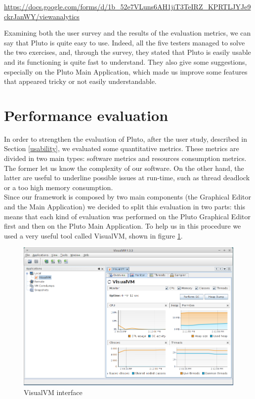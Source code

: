 \url{https://docs.google.com/forms/d/1b_52e7VLuns6AH1jiT3TeIRZ_KPRTLJYJe9ckrJanWY/viewanalytics}
\newpage

Examining both the user survey and the results of the evaluation metrics, we can say that Pluto is quite easy to use.
Indeed, all the five testers managed to solve the two exercises, and, through the survey, they stated that Pluto is easily usable and its functioning is quite fast to understand.
They also give some suggestions, especially on the Pluto Main Application, which made us improve some features that appeared tricky or not easily understandable.


\newpage

\section{Performance evaluation}\label{performance}

In order to strengthen the evaluation of Pluto, after the user study, described in Section \ref{usability}, we evaluated some quantitative metrics. These metrics are divided in two main types: software metrics and resources consumption metrics. The former let us know the complexity of our software.
On the other hand, the latter are useful to underline possible issues at run-time, such as thread deadlock or a too high memory consumption.
\\

Since our framework is composed by two main components (the Graphical Editor and the Main Application) we decided to split this evaluation in two parts: this means that each kind of evaluation was performed on the Pluto Graphical Editor first and then on the Pluto Main Application.
To help us in this procedure we used a very useful tool called VisualVM, shown in figure \ref{fig:visualVM}. 

\begin{figure}[H]
  \centering
  \includegraphics[width=\linewidth]{pictures/visualVM.png}
  \caption{VisualVM interface}
  \label{fig:visualVM}
\end{figure}

